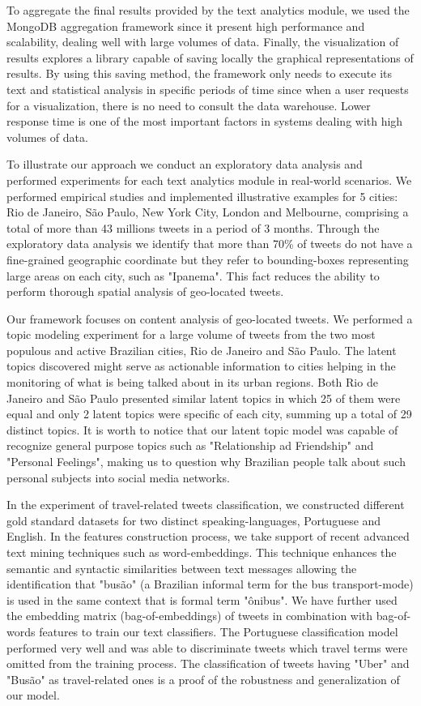 To aggregate the final results provided by the text analytics module, we used the MongoDB aggregation framework since it present high performance and scalability, dealing well with large volumes of data. Finally, the visualization of results explores a library capable of saving locally the graphical representations of results. By using this saving method, the framework only needs to execute its text and statistical analysis in specific periods of time since when a user requests for a visualization, there is no need to consult the data warehouse. Lower response time is one of the most important factors in systems dealing with high volumes of data.

To illustrate our approach we conduct an exploratory data analysis and performed experiments for each text analytics module in real-world scenarios. We performed empirical studies and implemented illustrative examples for 5 cities: Rio de Janeiro, São Paulo, New York City, London and Melbourne, comprising a total of more than 43 millions tweets in a period of 3 months. Through the exploratory data analysis we identify that more than 70\% of tweets do not have a fine-grained geographic coordinate but they refer to bounding-boxes representing large areas on each city, such as "Ipanema". This fact reduces the ability to perform thorough spatial analysis of geo-located tweets.

Our framework focuses on content analysis of geo-located tweets. We performed a topic modeling experiment for a large volume of tweets from the two most populous and active Brazilian cities, Rio de Janeiro and São Paulo. The latent topics discovered might serve as actionable information to cities helping in the monitoring of what is being talked about in its urban regions. Both Rio de Janeiro and São Paulo presented similar latent topics in which 25 of them were equal and only 2 latent topics were specific of each city, summing up a total of 29 distinct topics. It is worth to notice that our latent topic model was capable of recognize general purpose topics such as "Relationship ad Friendship" and "Personal Feelings", making us to question why Brazilian people talk about such personal subjects into social media networks.

In the experiment of travel-related tweets classification, we constructed different gold standard datasets for two distinct speaking-languages, Portuguese and English. In the features construction process, we take support of recent advanced text mining techniques such as word-embeddings. This technique enhances the semantic and syntactic similarities between text messages allowing the identification that "busão" (a Brazilian informal term for the bus transport-mode) is used in the same context that is formal term "ônibus". We have further used the embedding matrix (bag-of-embeddings) of tweets in combination with bag-of-words features to train our text classifiers. The Portuguese classification model performed very well and was able to discriminate tweets which travel terms were omitted from the training process. The classification of tweets having "Uber" and "Busão" as travel-related ones is a proof of the robustness and generalization of our model.

